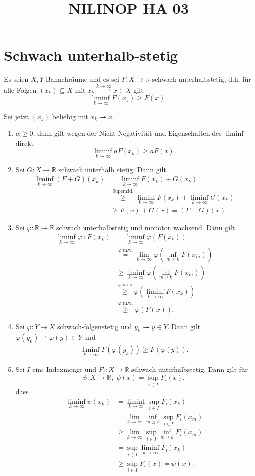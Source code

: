 \documentclass[a4paper]{article}
\title{NILINOP HA 03}
\newcommand{\wto}{\rightharpoonup}
\newcommand{\xwto}[1]{\stackrel{#1}\rightharpoonup}
\begin{document}
\section{Schwach unterhalb-stetig}
Es seien $X,Y$ Banachräume und es sei $F:X\to ℝ$ schwach unterhalbstetig, d.h. für alle Folgen $(x_k)\subseteq X$ mit $x_k\xwto{k\to ∞}x \in X$ gilt
$$\liminf_{k\to ∞} F(x_k) \ge F(x).$$

Sei jetzt $(x_k)$ beliebig mit $x_k\wto x$.
\begin{enumerate}
\item $α\ge 0$, dann gilt wegen der Nicht-Negativität und Eigenschaften des $\liminf$ direkt
$$\liminf_{k\to ∞} aF(x_k) \ge aF(x).$$
\item Sei $G\colon X\to ℝ$ schwach unterhalb stetig. Dann gilt
\begin{align*}
\liminf_{k\to ∞} (F+G)(x_k) &= \liminf_{k\to ∞} F(x_k) + G(x_k) \\
&\stackrel{\text{Superadd.}}\ge \liminf_{k\to ∞} F(x_k) + \liminf_{k\to ∞} G(x_k) \\
&\ge F(x) + G(x) = (F+G)(x).
\end{align*}
\item Sei $φ\colon ℝ\to ℝ$ schwach unterhalbstetig und monoton wachsend. Dann gilt
\begin{align*}
\liminf_{k\to ∞} φ\circ F (x_k) &= \liminf_{k\to ∞} φ\left( F(x_k)\right) \\
&\stackrel{\text{$φ$ m.w.}} = \lim_{k\to ∞} φ \left( \inf_{m\ge k} F(x_m) \right) \\
&\ge \liminf_{k\to ∞} φ \left( \inf_{m\ge k} F(x_m) \right)\\
&\stackrel{\text{$φ$ s.u.s}}\ge φ\left(\liminf_{k\to ∞} F(x_k) \right) \\
&\stackrel{\text{$φ$ m.w.}}\ge φ(F(x)).
\end{align*}
\item Sei $φ\colon Y\to X$ schwach-folgenstetig und $y_k\wto y\in Y$. Dann gilt $φ(y_k) \wto φ(y) \in Y$ und
\begin{align*}
\liminf_{k\to ∞} F(φ(y_k)) \ge F \left( φ(y) \right).
\end{align*}
\item Sei $I$ eine Indexmenge und $F_i\colon X\to ℝ$ schwach unterhalbstetig. Dann gilt für 
$$ψ\colon X\to ℝ, \; ψ(x) = \sup_{i\in I}F_i(x),$$
dass
\begin{align*}
\liminf_{k\to ∞} ψ(x_k) &= \liminf_{k\to ∞} \sup_{i\in I} F_i (x_k)\\
&= \lim_{k\to ∞} \inf_{m\ge k} \sup_{i\in I} F_i(x_m)\\
&\ge \lim_{k\to ∞} \sup_{i\in I} \inf_{m\ge k} F_i(x_m)\\
&= \sup_{i\in I} \liminf_{k\to ∞} F_i(x_k)\\
&\ge \sup_{i\in I} F_i (x) = ψ(x).
\end{align*}
\end{enumerate}
\end{document}
